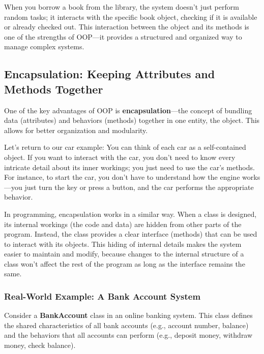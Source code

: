 \documentclass[
  letterpaper,
  DIV=11,
  numbers=noendperiod]{scrreprt}
\begin{document}
When you borrow a book from the library, the system doesn't just perform
random tasks; it interacts with the specific book object, checking if it
is available or already checked out. This interaction between the object
and its methods is one of the strengths of OOP---it provides a
structured and organized way to manage complex systems.

\hypertarget{encapsulation-keeping-attributes-and-methods-together}{%
\subsection{Encapsulation: Keeping Attributes and Methods
Together}\label{encapsulation-keeping-attributes-and-methods-together}}

One of the key advantages of OOP is \textbf{encapsulation}---the concept
of bundling data (attributes) and behaviors (methods) together in one
entity, the object. This allows for better organization and modularity.

Let's return to our car example: You can think of each car as a
self-contained object. If you want to interact with the car, you don't
need to know every intricate detail about its inner workings; you just
need to use the car's methods. For instance, to start the car, you don't
have to understand how the engine works---you just turn the key or press
a button, and the car performs the appropriate behavior.

In programming, encapsulation works in a similar way. When a class is
designed, its internal workings (the code and data) are hidden from
other parts of the program. Instead, the class provides a clear
interface (methods) that can be used to interact with its objects. This
hiding of internal details makes the system easier to maintain and
modify, because changes to the internal structure of a class won't
affect the rest of the program as long as the interface remains the
same.

\hypertarget{real-world-example-a-bank-account-system}{%
\subsubsection{Real-World Example: A Bank Account
System}\label{real-world-example-a-bank-account-system}}

Consider a \textbf{BankAccount} class in an online banking system. This
class defines the shared characteristics of all bank accounts (e.g.,
account number, balance) and the behaviors that all accounts can perform
(e.g., deposit money, withdraw money, check balance).
\end{document}
